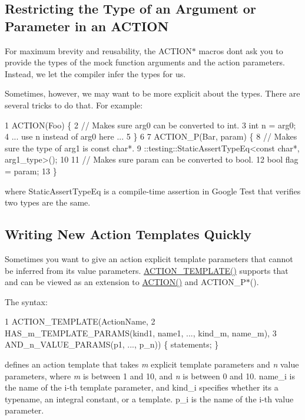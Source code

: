 \subsection*{Restricting the Type of an Argument or Parameter in an A\+C\+T\+I\+ON}

For maximum brevity and reusability, the {\ttfamily A\+C\+T\+I\+O\+N$\ast$} macros don\textquotesingle{}t ask you to provide the types of the mock function arguments and the action parameters. Instead, we let the compiler infer the types for us.

Sometimes, however, we may want to be more explicit about the types. There are several tricks to do that. For example\+: 
\begin{DoxyCode}
1 ACTION(Foo) \{
2   // Makes sure arg0 can be converted to int.
3   int n = arg0;
4   ... use n instead of arg0 here ...
5 \}
6 
7 ACTION\_P(Bar, param) \{
8   // Makes sure the type of arg1 is const char*.
9   ::testing::StaticAssertTypeEq<const char*, arg1\_type>();
10 
11   // Makes sure param can be converted to bool.
12   bool flag = param;
13 \}
\end{DoxyCode}
 where {\ttfamily Static\+Assert\+Type\+Eq} is a compile-\/time assertion in Google Test that verifies two types are the same.

\subsection*{Writing New Action Templates Quickly}

Sometimes you want to give an action explicit template parameters that cannot be inferred from its value parameters. {\ttfamily \hyperlink{gmock-generated-actions_8h_ad04fa741f313f0c23924d61fcfb1536d}{A\+C\+T\+I\+O\+N\+\_\+\+T\+E\+M\+P\+L\+A\+T\+E()}} supports that and can be viewed as an extension to {\ttfamily \hyperlink{gmock-generated-actions_8h_a7af7137aa4871df4235881af377205fe}{A\+C\+T\+I\+O\+N()}} and {\ttfamily A\+C\+T\+I\+O\+N\+\_\+\+P$\ast$()}.

The syntax\+: 
\begin{DoxyCode}
1 ACTION\_TEMPLATE(ActionName,
2                 HAS\_m\_TEMPLATE\_PARAMS(kind1, name1, ..., kind\_m, name\_m),
3                 AND\_n\_VALUE\_PARAMS(p1, ..., p\_n)) \{ statements; \}
\end{DoxyCode}


defines an action template that takes {\itshape m} explicit template parameters and {\itshape n} value parameters, where {\itshape m} is between 1 and 10, and {\itshape n} is between 0 and 10. {\ttfamily name\+\_\+i} is the name of the i-\/th template parameter, and {\ttfamily kind\+\_\+i} specifies whether it\textquotesingle{}s a {\ttfamily typename}, an integral constant, or a template. {\ttfamily p\+\_\+i} is the name of the i-\/th value parameter.

